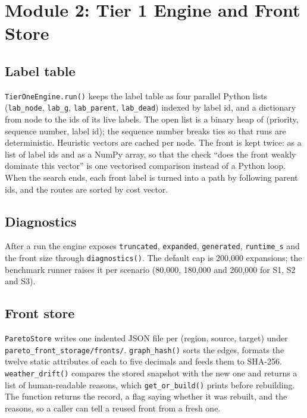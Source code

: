\documentclass{ssnreview}
\begin{document}
\section{Module 2: Tier 1 Engine and Front Store}

\subsection{Label table}

\texttt{TierOneEngine.run()} keeps the label table as four parallel Python lists
(\texttt{lab\_node}, \texttt{lab\_g}, \texttt{lab\_parent}, \texttt{lab\_dead}) indexed by
label id, and a dictionary from node to the ids of its live labels. The open list is a
binary heap of (priority, sequence number, label id); the sequence number breaks ties so
that runs are deterministic. Heuristic vectors are cached per node. The front is kept
twice: as a list of label ids and as a NumPy array, so that the check ``does the front
weakly dominate this vector'' is one vectorised comparison instead of a Python loop. When
the search ends, each front label is turned into a path by following parent ids, and the
routes are sorted by cost vector.

\subsection{Diagnostics}

After a run the engine exposes \texttt{truncated}, \texttt{expanded}, \texttt{generated},
\texttt{runtime\_s} and the front size through \texttt{diagnostics()}. The default cap is
200,000 expansions; the benchmark runner raises it per scenario (80,000, 180,000 and
260,000 for S1, S2 and S3).

\subsection{Front store}

\texttt{ParetoStore} writes one indented JSON file per (region, source, target) under
\texttt{pareto\_front\_storage/fronts/}. \texttt{graph\_hash()} sorts the edges, formats the
twelve static attributes of each to five decimals and feeds them to SHA-256.
\texttt{weather\_drift()} compares the stored snapshot with the new one and returns a list
of human-readable reasons, which \texttt{get\_or\_build()} prints before rebuilding. The
function returns the record, a flag saying whether it was rebuilt, and the reasons, so a
caller can tell a reused front from a fresh one.
\end{document}
